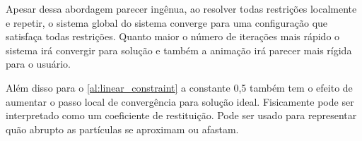 Apesar dessa abordagem parecer ingênua, ao resolver todas restrições localmente e repetir, o sistema global do sistema converge para uma configuração que satisfaça todas restrições. Quanto maior o número de iterações mais rápido o sistema irá convergir para solução e também a animação irá parecer mais rígida para o usuário.

Além disso para o \ref{al:linear_constraint} a constante 0,5 também tem o efeito de aumentar o passo local de convergência para solução ideal. Fisicamente pode ser interpretado como um coeficiente de restituição. Pode ser usado para representar quão abrupto as partículas se aproximam ou afastam.
